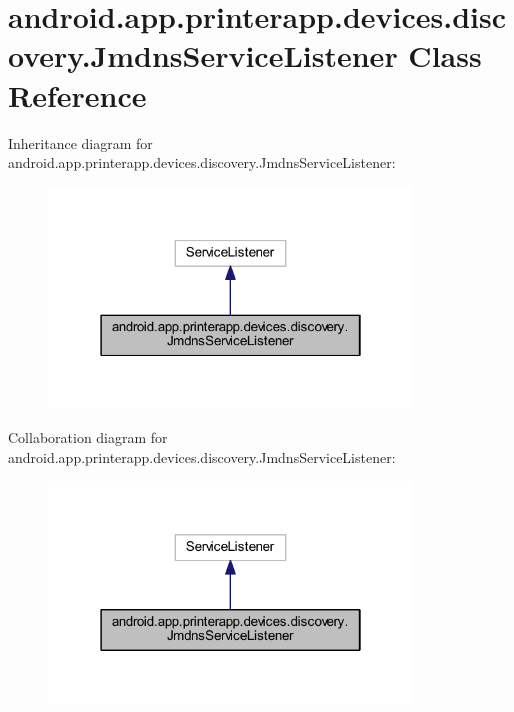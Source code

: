 \hypertarget{classandroid_1_1app_1_1printerapp_1_1devices_1_1discovery_1_1_jmdns_service_listener}{}\section{android.\+app.\+printerapp.\+devices.\+discovery.\+Jmdns\+Service\+Listener Class Reference}
\label{classandroid_1_1app_1_1printerapp_1_1devices_1_1discovery_1_1_jmdns_service_listener}


Inheritance diagram for android.\+app.\+printerapp.\+devices.\+discovery.\+Jmdns\+Service\+Listener\+:
\nopagebreak
\begin{figure}[H]
\begin{center}
\leavevmode
\includegraphics[width=274pt]{classandroid_1_1app_1_1printerapp_1_1devices_1_1discovery_1_1_jmdns_service_listener__inherit__graph}
\end{center}
\end{figure}


Collaboration diagram for android.\+app.\+printerapp.\+devices.\+discovery.\+Jmdns\+Service\+Listener\+:
\nopagebreak
\begin{figure}[H]
\begin{center}
\leavevmode
\includegraphics[width=274pt]{classandroid_1_1app_1_1printerapp_1_1devices_1_1discovery_1_1_jmdns_service_listener__coll__graph}
\end{center}
\end{figure}
